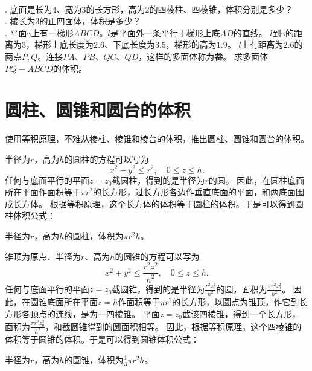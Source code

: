 \documentclass[12pt,UTF8,fontset=none]{ctexbook}
\begin{document}
\begin{xt}
    \mbox{}\\
    . 底面是长为$4$、宽为$3$的长方形，高为$2$的四棱柱、四棱锥，体积分别是多少？\\
    . 棱长为$3$的正四面体，体积是多少？\\
    . 平面$\gamma$上有一梯形$ABCD$。$l$是平面外一条平行于梯形上底$AD$的直线。
    $l$到$\gamma$的距离为$3$，梯形上底长度为$2.6$、下底长度为$3.5$，梯形的高为$1.9$。
    $l$上有距离为$2.6$的两点$P,Q$。连接$PA$、$PB$、$QC$、$QD$，这样的多面体称为\textbf{畚}。
    求多面体$PQ-ABCD$的体积。
\end{xt}

\section{圆柱、圆锥和圆台的体积}
使用等积原理，不难从棱柱、棱锥和棱台的体积，推出圆柱、圆锥和圆台的体积。

半径为$r$，高为$h$的圆柱的方程可以写为
$$ x^2 + y^2 \leqslant r^2 , \quad 0\leqslant z \leqslant h.$$
任何与底面平行的平面$z=z_0$截圆柱，得到的是半径为$r$的圆。
因此，在圆柱底面所在平面作面积等于$\pi r^2$的长方形，过长方形各边作垂直底面的平面，和两底面围成长方体。
根据等积原理，这个长方体的体积等于圆柱的体积。于是可以得到圆柱体积公式：
\begin{tm}\label{tm:3-3-0}
    半径为$r$，高为$h$的圆柱，体积为$\pi r^2h$。
\end{tm}

锥顶为原点、半径为$r$、高为$h$的圆锥的方程可以写为
$$ x^2 + y^2 \leqslant \frac{r^2z^2}{h^2} , \quad 0\leqslant z \leqslant h.$$
任何与底面平行的平面$z=z_0$截圆锥，得到的是半径为$\frac{r^2z_0^2}{h^2}$的圆，面积为$\frac{\pi r^2z_0^2}{h^2}$。
因此，在圆锥底面所在平面$z=h$作面积等于$\pi r^2$的长方形，以圆点为锥顶，作它到长方形各顶点的连线，是为一四棱锥。
平面$z=z_0$截该四棱锥，得到一个长方形，面积为$\frac{\pi r^2z_0^2}{h^2}$，和截圆锥得到的圆面积相等。
因此，根据等积原理，这个四棱锥的体积等于圆锥的体积。于是可以得到圆锥体积公式：
\begin{tm}\label{tm:3-3-10}
    半径为$r$，高为$h$的圆锥，体积为$\frac{1}{3}\pi r^2h$。
\end{tm}
\end{document}
